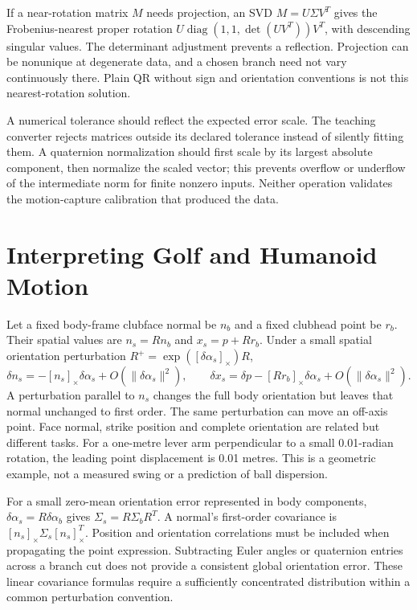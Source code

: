 If a near-rotation matrix $M$ needs projection, an SVD $M=U\Sigma V^T$ gives the Frobenius-nearest proper rotation $U\operatorname{diag}(1,1,\det(UV^T))V^T$, with descending singular values. The determinant adjustment prevents a reflection. Projection can be nonunique at degenerate data, and a chosen branch need not vary continuously there. Plain QR without sign and orientation conventions is not this nearest-rotation solution.

A numerical tolerance should reflect the expected error scale. The teaching converter rejects matrices outside its declared tolerance instead of silently fitting them. A quaternion normalization should first scale by its largest absolute component, then normalize the scaled vector; this prevents overflow or underflow of the intermediate norm for finite nonzero inputs. Neither operation validates the motion-capture calibration that produced the data.

\section{Interpreting Golf and Humanoid Motion}
\label{sec:rotation_tasks}

Let a fixed body-frame clubface normal be $n_b$ and a fixed clubhead point be $r_b$. Their spatial values are $n_s=Rn_b$ and $x_s=p+Rr_b$. Under a small spatial orientation perturbation $R^+=\exp([\delta\alpha_s]_\times)R$,
\begin{equation}
 \delta n_s=-[n_s]_\times\delta\alpha_s+O(\|\delta\alpha_s\|^2),
 \qquad
 \delta x_s=\delta p-[Rr_b]_\times\delta\alpha_s+O(\|\delta\alpha_s\|^2).
 \label{eq:clubface_point_sensitivity}
\end{equation}
A perturbation parallel to $n_s$ changes the full body orientation but leaves that normal unchanged to first order. The same perturbation can move an off-axis point. Face normal, strike position and complete orientation are related but different tasks. For a one-metre lever arm perpendicular to a small 0.01-radian rotation, the leading point displacement is 0.01 metres. This is a geometric example, not a measured swing or a prediction of ball dispersion.

For a small zero-mean orientation error represented in body components, $\delta\alpha_s=R\delta\alpha_b$ gives $\Sigma_s=R\Sigma_bR^T$. A normal's first-order covariance is $[n_s]_\times\Sigma_s[n_s]_\times^T$. Position and orientation correlations must be included when propagating the point expression. Subtracting Euler angles or quaternion entries across a branch cut does not provide a consistent global orientation error. These linear covariance formulas require a sufficiently concentrated distribution within a common perturbation convention.

